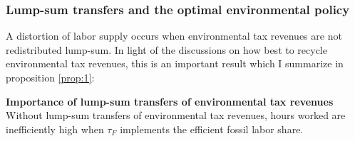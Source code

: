\subsubsection{Lump-sum transfers and the optimal environmental policy}\label{subsec:nolump}

A distortion of labor supply occurs when environmental tax revenues are not redistributed lump-sum.
In light of the discussions on how best to recycle environmental tax revenues, this is an important result which I summarize in proposition \ref{prop:1}:

\begin{prop}\label{prop:1}\textbf{Importance of lump-sum transfers of environmental tax revenues}
	Without lump-sum transfers of environmental tax revenues, hours worked are inefficiently high when $\tau_{F}$ implements the efficient fossil labor share.
\end{prop}

